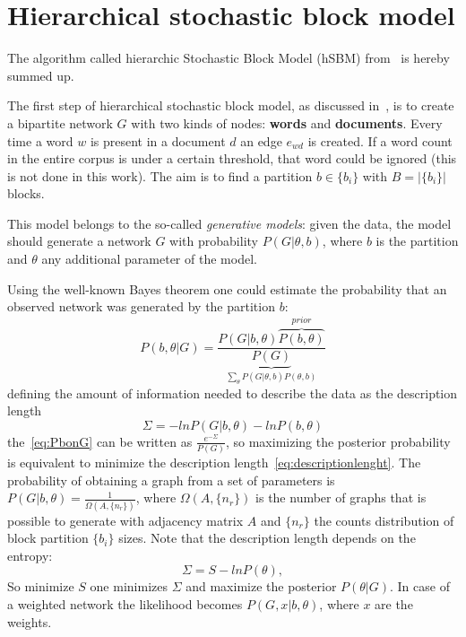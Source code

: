 \appendix
\chapter{Hierarchical stochastic block model}\label{app:hsbm}
The algorithm called hierarchic Stochastic Block Model (hSBM) from~\cite{gerlach2018network} is hereby summed up.

The first step of hierarchical stochastic block model, as discussed in~\cite{peixoto2014efficient}, is to create a bipartite network $G$ with two kinds of nodes: \textbf{words} and \textbf{documents}. Every time a word $w$ is present in a document $d$ an edge $e_{wd}$ is created. If a word count in the entire corpus is under a certain threshold, that word could be ignored (this is not done in this work). The aim is to find a partition $b\in\{b_i\}$ with $B=\left|\{b_i\}\right|$ blocks.

This model belongs to the so-called \textit{generative models}: given the data, the model should generate a network $G$ with probability $P(G|\theta, b)$, where $b$ is the partition and $\theta$ any additional parameter of the model.

Using the well-known Bayes theorem one could estimate the probability that an observed network was generated by the partition $b$:
\begin{equation}\label{eq:PbonG}
  P(b,\theta|G)=\frac{P(G|b,\theta)\overbrace{P(b,\theta)}^{prior}}{\underbrace{P(G)}_{\sum_{\theta}P(G|\theta, b)P(\theta, b)}}
\end{equation}
defining the amount of information needed to describe the data as the description length
\begin{equation}\label{eq:descriptionlenght}
  \Sigma=-lnP(G|b,\theta)-lnP(b, \theta)
\end{equation}
the~\ref{eq:PbonG} can be written as $\frac{e^{-\Sigma}}{P(G)}$, so maximizing the posterior probability is equivalent to minimize the description length~\ref{eq:descriptionlenght}. The probability of obtaining a graph from a set of parameters is $P(G|b,\theta)=\frac{1}{\Omega(A,\{n_r\})}$, where $\Omega(A,\{n_r\})$ is the number of graphs that is possible to generate with adjacency matrix $A$ and $\{n_r\}$ the counts distribution of block partition $\{b_i\}$ sizes.
Note that the description length depends on the entropy:
\[
\Sigma=S-lnP(\theta),
\]
So minimize $S$ one minimizes $\Sigma$ and maximize the posterior $P(\theta|G)$.
In case of a weighted network the likelihood becomes $P(G,x|b,\theta)$, where $x$ are the weights.

